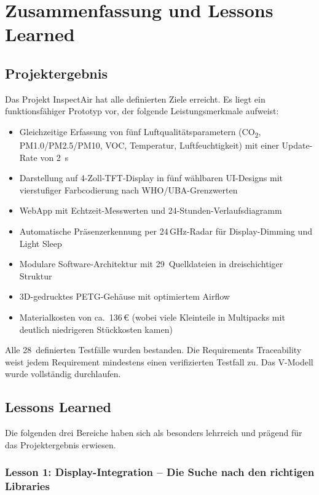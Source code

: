 \chapter{Zusammenfassung und Lessons Learned}
\label{cha:zusammenfassung}

\section{Projektergebnis}

Das Projekt InspectAir hat alle definierten Ziele erreicht. Es liegt ein funktionsfähiger Prototyp vor, der folgende Leistungsmerkmale aufweist:

\begin{itemize}[nosep]
\item Gleichzeitige Erfassung von fünf Luftqualitätsparametern (CO\textsubscript{2}, PM1.0/PM2.5/PM10, VOC, Temperatur, Luftfeuchtigkeit) mit einer Update-Rate von \SI{2}{\second}
\item Darstellung auf 4-Zoll-TFT-Display in fünf wählbaren UI-Designs mit vierstufiger Farbcodierung nach WHO/UBA-Grenzwerten
\item WebApp mit Echtzeit-Messwerten und 24-Stunden-Verlaufsdiagramm
\item Automatische Präsenzerkennung per 24\,GHz-Radar für Display-Dimming und Light Sleep
\item Modulare Software-Architektur mit 29~Quelldateien in dreischichtiger Struktur
\item 3D-gedrucktes PETG-Gehäuse mit optimiertem Airflow
\item Materialkosten von ca.\ 136\,\euro{} (wobei viele Kleinteile in Multipacks mit deutlich niedrigeren Stückkosten kamen)
\end{itemize}

Alle 28~definierten Testfälle wurden bestanden. Die Requirements Traceability weist jedem Requirement mindestens einen verifizierten Testfall zu. Das V-Modell wurde vollständig durchlaufen.

\section{Lessons Learned}

Die folgenden drei Bereiche haben sich als besonders lehrreich und prägend für das Projektergebnis erwiesen.

\subsection{Lesson 1: Display-Integration -- Die Suche nach den richtigen Libraries}
\label{sec:lesson_display}

